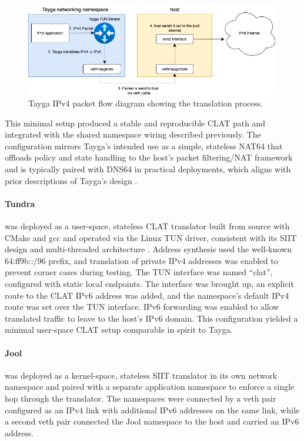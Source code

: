 \begin{figure}[H]
    \centering
    \caption{Tayga IPv4 packet flow diagram showing the translation process.}
    \label{fig:tayga_flow}
    \includegraphics[width=1\textwidth]{resources/images/taygaflow.png}
\end{figure}

This minimal setup produced a stable and reproducible CLAT path and integrated with the shared namespace wiring described previously. The configuration mirrors Tayga’s intended use as a simple, stateless NAT64 that offloads policy and state handling to the host’s packet filtering/NAT framework and is typically paired with DNS64 in practical deployments, which aligns with prior descriptions of Tayga’s design \cite{Repas_Farnadi_Lencse_2014,palrd_tayga_readme}.

\paragraph{Tundra} 
was deployed as a user‑space, stateless CLAT translator built from source with CMake and gcc and operated via the Linux TUN driver, consistent with its SIIT design and multi-threaded architecture \cite{rfc7915,labuda_tundra_nat64}. Address synthesis used the well-known 64:ff9b::/96 prefix, and translation of private IPv4 addresses was enabled to prevent corner cases during testing. The TUN interface was named “clat”, configured with static local endpoints. The interface was brought up, an explicit route to the CLAT IPv6 address was added, and the namespace’s default IPv4 route was set over the TUN interface. IPv6 forwarding was enabled to allow translated traffic to leave to the host’s IPv6 domain. This configuration yielded a minimal user-space CLAT setup comparable in spirit to Tayga\cite{labuda_tundra_nat64}.

\paragraph{Jool}
was deployed as a kernel-space, stateless SIIT translator in its own network namespace and paired with a separate application namespace to enforce a single hop through the translator. The namespaces were connected by a veth pair configured as an IPv4 link with additional IPv6 addresses on the same link, while a second veth pair connected the Jool namespace to the host and carried an IPv6 address. 

